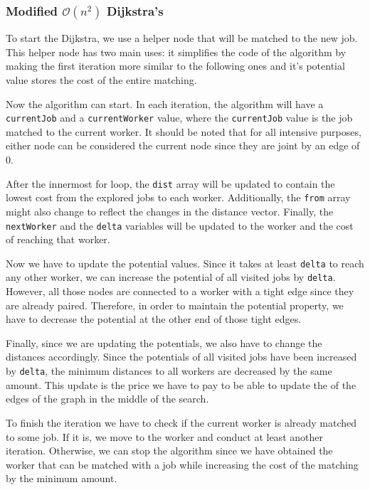 \newpage
\subsubsection{Modified $\mathcal{O}(n^2)$ Dijkstra's}
To start the Dijkstra, we use a helper node that will be matched to the 
new job. This helper node has two main uses: it simplifies the code
of the algorithm by making the first iteration more similar to the following
ones and it's potential value stores the cost of the entire matching.


Now the algorithm can start. In each iteration, the algorithm will have a 
\texttt{currentJob} and a \texttt{currentWorker} value, where the 
\texttt{currentJob} value is the job matched to the current worker. 
It should be noted that for all intensive purposes, either node
can be considered the current node since they are joint by an edge of 
 0.

After the innermost for loop, the \texttt{dist} array will be updated
to contain the lowest cost from the explored jobs to each worker. 
Additionally, the \texttt{from} array might also change to reflect
the changes in the distance vector. Finally, the \texttt{nextWorker}
and the \texttt{delta} variables will be updated to the 
worker and the cost of reaching that worker.

Now we have to update the potential values. Since it takes at least
\texttt{delta} to reach any other worker, we can increase the 
potential of all visited jobs by \texttt{delta}. However, all
those nodes are connected to a worker with a tight edge since they
are already paired. Therefore, in order to maintain the 
potential property, we have to decrease the potential at the other
end of those tight edges.

Finally, since we are updating the potentials, we also have to change
the distances accordingly. Since the potentials of all visited jobs
have been increased by \texttt{delta}, the minimum distances to all
workers are decreased by the same amount. This update is the price we have to 
pay to be able to update the  of the edges of the graph in 
the middle of the search.

To finish the iteration we have to check if the current worker is
already matched to some job. If it is, we move to the worker and conduct
at least another iteration. Otherwise, we can stop the algorithm since
we have obtained the worker that can be matched with a job while increasing
the cost of the matching by the minimum amount.

